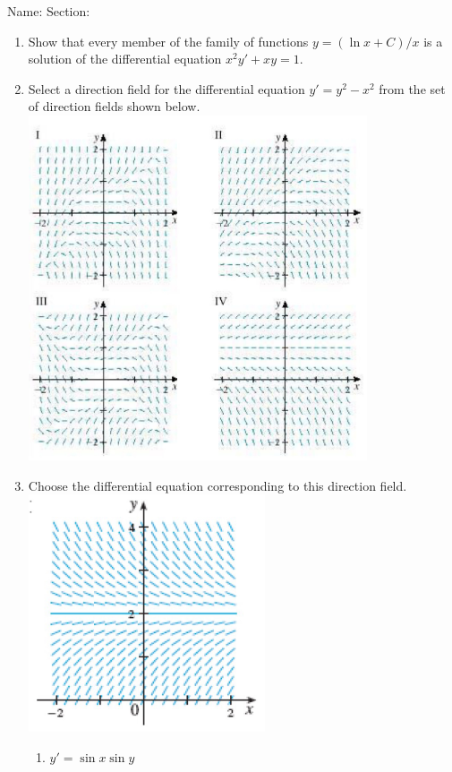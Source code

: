 \documentclass[12pt]{article}
\begin{document}
\noindent Name: \hspace{4in}Section:
\vspace{0.5cm}



\begin{enumerate}
\item Show that every member of the family of functions $y=(\ln{x}+C)/x$ is a solution of the differential equation $x^2y'+xy=1$.
\vfill
\item Select a direction field for the differential equation $y'=y^2-x^2$ from the set of direction fields shown below.\\
\includegraphics[width=10cm]{IMG_2808.jpg}
\newpage
\item Choose the differential equation corresponding to this direction field.\\
\includegraphics[width=7cm]{IMG_2807.jpg}
\begin{enumerate}
    \item $y'=\sin{x}\sin{y}$

\end{enumerate}
\end{enumerate}
\end{document}

